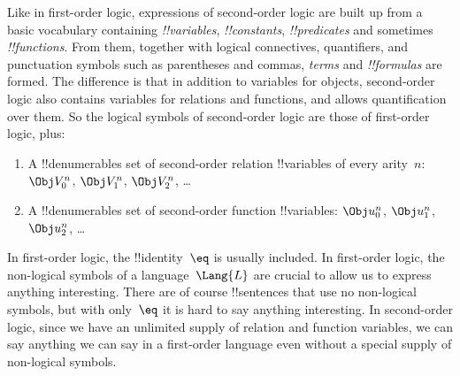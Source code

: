 \documentclass[../../../include/open-logic-section]{subfiles}
\begin{document}


Like in first-order logic, expressions of second-order logic are built
up from a basic vocabulary containing \emph{!!{variable}s},
\emph{!!{constant}s}, \emph{!!{predicate}s} and sometimes
\emph{!!{function}s}.  From them, together with logical connectives,
quantifiers, and punctuation symbols such as parentheses and commas,
\emph{terms} and \emph{!!{formula}s} are formed.  The difference is
that in addition to variables for objects, second-order logic also
contains variables for relations and functions, and allows
quantification over them. So the logical symbols of second-order logic
are those of first-order logic, plus:

\begin{enumerate}
\item A !!{denumerable}s set of second-order relation !!{variable}s of
  every arity~$n$: $\Obj V_0^n$, $\Obj V_1^n$, $\Obj V_2^n$, \dots
\item A !!{denumerable}s set of second-order function !!{variable}s:
  $\Obj u_0^n$, $\Obj u_1^n$, $\Obj u_2^n$, \dots
\end{enumerate}

In first-order logic, the !!{identity}~$\eq$ is usually included. In
first-order logic, the non-logical symbols of a language~$\Lang{L}$
are crucial to allow us to express anything interesting. There are of
course !!{sentences} that use no non-logical symbols, but with
only~$\eq$ it is hard to say anything interesting.  In second-order
logic, since we have an unlimited supply of relation and function
variables, we can say anything we can say in a first-order language
even without a special supply of non-logical symbols.
\end{document}
